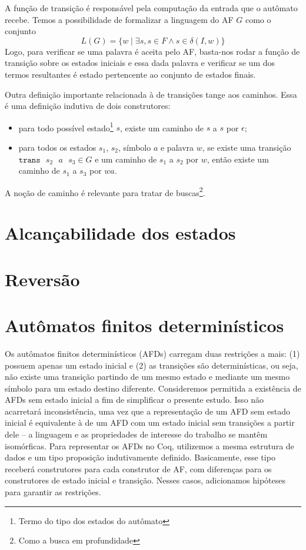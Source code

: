 A função de transição é responsável pela computação da entrada que o autômato recebe. Temos a possibilidade de formalizar a linguagem do AF $G$ como o conjunto $$L(G) = \{ w \mid \exists s, s \in F \wedge s \in \delta(I, w) \}$$ Logo, para verificar se uma palavra é aceita pelo AF, basta-nos rodar a função de transição sobre os estados iniciais e essa dada palavra e verificar se um dos termos resultantes é estado pertencente ao conjunto de estados finais.

Outra definição importante relacionada à de transições tange aos caminhos. Essa é uma definição indutiva de dois construtores: \begin{itemize}
  \item para todo possível estado\footnote{Termo do tipo dos estados do autômato} $s$, existe um caminho de $s$ a $s$ por $\epsilon$;
  \item para todos os estados $s_1$, $s_2$, símbolo $a$ e palavra $w$, se existe uma transição $\texttt{trans}\text{ }s_2\text{ }a\text{ }s_3 \in G$ e um caminho de $s_1$ a $s_2$ por $w$, então existe um caminho de $s_1$ a $s_3$ por $wa$.
\end{itemize} A noção de caminho é relevante para tratar de buscas\footnote{Como a busca em profundidade}.

\section{Alcançabilidade dos estados}

\section{Reversão}

\section{Autômatos finitos determinísticos}

Os autômatos finitos determinísticos (AFDs) carregam duas restrições a mais: (1) possuem apenas um estado inicial e (2) as transições são determinísticas, ou seja, não existe uma transição partindo de um mesmo estado e mediante um mesmo símbolo para um estado destino diferente. Consideremos permitida a existência de AFDs sem estado inicial a fim de simplificar o presente estudo. Isso não acarretará inconsistência, uma vez que a representação de um AFD sem estado inicial é equivalente à de um AFD com um estado inicial sem transições a partir dele -- a linguagem e as propriedades de interesse do trabalho se mantêm isomórficas. Para representar os AFDs no Coq, utilizemos a mesma estrutura de dados e um tipo proposição indutivamente definido. Basicamente, esse tipo receberá construtores para cada construtor de AF, com diferenças para os construtores de estado inicial e transição. Nesses casos, adicionamos hipóteses para garantir as restrições.

